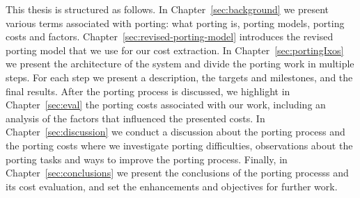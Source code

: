 This thesis is structured as follows. In Chapter~\ref{sec:background} we present
various terms associated with porting: what porting is, porting models, porting
costs and factors. Chapter~\ref{sec:revised-porting-model} introduces the revised
porting model that we use for our cost extraction. In
Chapter~\ref{sec:portingIxos} we present the architecture of the system and
divide the porting work in multiple steps. For each step we present a
description, the targets and milestones, and the final results. After the
porting process is discussed, we highlight in Chapter~\ref{sec:eval} the porting
costs associated with our work, including an analysis of the factors that
influenced the presented costs. In Chapter~\ref{sec:discussion} we conduct a
discussion about the porting process and the porting costs where we investigate
porting difficulties, observations about the porting tasks and ways to improve
the porting process. Finally, in Chapter~\ref{sec:conclusions} we present the
conclusions of the porting processs and its cost evaluation, and set the
enhancements and objectives for further work.
